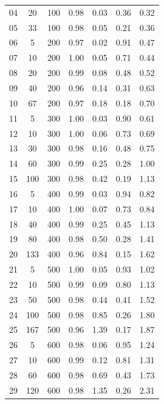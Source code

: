\documentclass[11pt]{article}
\begin{document}
\begin{table}[]
\begin{tabular}{ccccccc}
			\rowcolor[HTML]{EFEFEF} 
			04 & 20 & 100 & 0.98 & 0.03 & 0.36 & 0.32 \\
			\rowcolor[HTML]{EFEFEF} 
			05 & 33 & 100 & 0.98 & 0.05 & 0.21 & 0.36 \\
			06 & 5 & 200 & 0.97 & 0.02 & 0.91 & 0.47 \\ 
			07 & 10 & 200 & 1.00 & 0.05 & 0.71 & 0.44 \\
			08 & 20 & 200 & 0.99 & 0.08 & 0.48 & 0.52 \\
			09 & 40 & 200 & 0.96 & 0.14 & 0.31 & 0.63 \\
			10 & 67 & 200 & 0.97 & 0.18 & 0.18 & 0.70 \\
			\rowcolor[HTML]{EFEFEF} 
			11 & 5 & 300 & 1.00 & 0.03 & 0.90 & 0.61 \\ 
			\rowcolor[HTML]{EFEFEF} 
			12 & 10 & 300 & 1.00 & 0.06 & 0.73 & 0.69 \\ 
			\rowcolor[HTML]{EFEFEF} 
			13 & 30 & 300 & 0.98 & 0.16 & 0.48 & 0.75 \\ 
			\rowcolor[HTML]{EFEFEF} 
			14 & 60 & 300 & 0.99 & 0.25 & 0.28 & 1.00 \\ 
			\rowcolor[HTML]{EFEFEF} 
			15 & 100 & 300 & 0.98 & 0.42 & 0.19 & 1.13 \\
			16 & 5 & 400 & 0.99 & 0.03 & 0.94 & 0.82 \\ 
			17 & 10 & 400 & 1.00 & 0.07 & 0.73 & 0.84 \\ 
			18 & 40 & 400 & 0.99 & 0.25 & 0.45 & 1.13 \\ 
			19 & 80 & 400 & 0.98 & 0.50 & 0.28 & 1.41 \\ 
			20 & 133 & 400 & 0.96 & 0.84 & 0.15 & 1.62 \\ 
			\rowcolor[HTML]{EFEFEF} 
			21 & 5 & 500 & 1.00 & 0.05 & 0.93 & 1.02 \\ 
			\rowcolor[HTML]{EFEFEF} 
			22 & 10 & 500 & 0.99 & 0.09 & 0.80 & 1.13 \\ 
			\rowcolor[HTML]{EFEFEF} 
			23 & 50 & 500 & 0.98 & 0.44 & 0.41 & 1.52 \\ 
			\rowcolor[HTML]{EFEFEF} 
			24 & 100 & 500 & 0.98 & 0.85 & 0.26 & 1.80 \\
			\rowcolor[HTML]{EFEFEF} 
			25 & 167 & 500 & 0.96 & 1.39 & 0.17 & 1.87 \\
			26 & 5 & 600 & 0.98 & 0.06 & 0.95 & 1.24 \\ 
			27 & 10 & 600 & 0.99 & 0.12 & 0.81 & 1.31 \\ 
			28 & 60 & 600 & 0.98 & 0.69 & 0.43 & 1.73 \\ 
			29 & 120 & 600 & 0.98 & 1.35 & 0.26 & 2.31 \\ 

\end{tabular}
\end{table}
\end{document}
